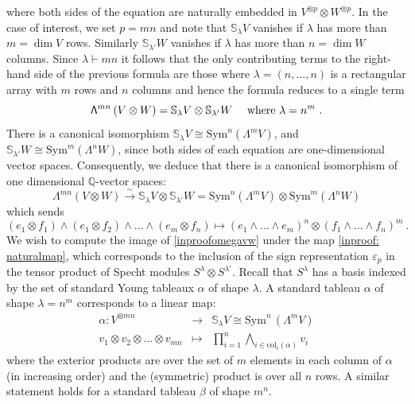 \documentclass[10pt]{amsart}
\theoremstyle{definition}
\theoremstyle{remark}
\numberwithin{equation}{section}
\newcommand{\To}{\longrightarrow}
\newcommand{\Q}{\mathbb Q}
\newcommand{\bwedge}{\mathsf{\Lambda}}
\newcommand{\Sym}{\mathrm{Sym}}
\newcommand{\0}{\color{blue}{\mathsf{0}}}
\begin{document}
 where both sides of the equation are naturally embedded  in $V^{\otimes p}\otimes W^{\otimes p}$. In  the case of interest, we  set  $p=mn$ and note that 
 $\mathbb{S}_{\lambda} V$ vanishes if $\lambda$ has more than $m=\dim V$ rows. Similarly  
  $\mathbb{S}_{\lambda'} W$ vanishes if $\lambda$ has more than $n=\dim W$ columns. Since $\lambda \vdash mn$ it follows that the only contributing terms to the right-hand side of the previous formula are those where $\lambda = (n,\ldots, n)$ is a rectangular array with $m$ rows and $n$ columns and hence the formula reduces to a single term
  \[  \bwedge^{mn} \left( V \otimes W \right)  =    \mathbb{S}_{\lambda} V \otimes  \mathbb{S}_{\lambda'} W \quad \hbox{ where } \lambda = n^m\ . \]
   There is a  canonical isomorphism 
   $  \mathbb{S}_{\lambda} V \cong \mathrm{Sym}^n 
  \!\left(\bwedge^m V\right) $, and 
  $\mathbb{S}_{\lambda'} W  \cong  \mathrm{Sym}^m ( \bwedge^n W)$, since both sides of each equation are one-dimensional vector spaces. Consequently, we deduce that there is a canonical  isomorphism of one dimensional  $\Q$-vector spaces:
    \begin{equation} \label{inproof: naturalmap}   \bwedge^{mn} \left( V \otimes W \right)  \overset{\sim}{\To}    \mathbb{S}_{\lambda} V \otimes  \mathbb{S}_{\lambda'} W=\Sym^n \! \left( \bwedge^m V\right)  \otimes  \Sym^m \!\left( \bwedge^n W\right)
   \end{equation} 
which  sends
   \[ (e_1 \otimes f_1) \wedge (e_1 \otimes f_2) \wedge \ldots  \wedge (e_m \otimes f_n)  \mapsto  (e_1 \wedge \ldots \wedge e_m)^n \otimes (f_1 \wedge \ldots \wedge f_n)^m \ . \] 
  We wish to compute the image of \eqref{inproofomegavw} under the map \eqref{inproof: naturalmap}, 
    which  corresponds to the inclusion of the sign representation $\varepsilon_p$ in the tensor product of Specht modules $S^{\lambda} \otimes S^{\lambda'}$.     Recall that $S^{\lambda}$ has a basis indexed by the set of standard Young tableaux $\alpha$ of shape $\lambda$. 
 A standard tableau  $\alpha$ of shape $\lambda = n^m$  corresponds to a linear map:
   \begin{eqnarray} \label{inproof:alphadet} 
   \alpha:  V^{\otimes mn} & \To & \mathbb{S}_{\lambda} V \cong \mathrm{Sym}^n 
  \,  (\bwedge^m V)   \\ 
 v_1 \otimes v_2 \otimes \ldots \otimes v_{mn}  &   \mapsto  &  \prod_{i=1}^n  \bigwedge_{i\in \mathrm{col}_i(\alpha)} v_i   \nonumber 
   \end{eqnarray} 
     where the exterior products are over the set of $m$ elements in each column of $\alpha$ (in increasing order) and the (symmetric) product  is over all $n$ rows. A similar statement holds for  a standard tableau $\beta$ of shape $m^n$. 
 
\end{document}

